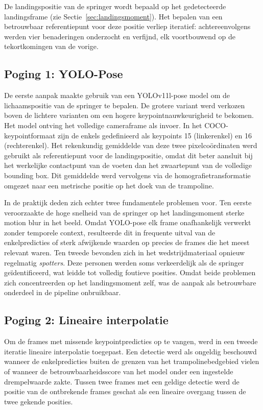 De landingspositie van de springer wordt bepaald op het gedetecteerde landingsframe (zie Sectie~\ref{sec:landingsmoment}). Het bepalen van een betrouwbaar referentiepunt voor deze positie verliep iteratief: achtereenvolgens werden vier benaderingen onderzocht en verfijnd, elk voortbouwend op de tekortkomingen van de vorige.

\subsection{Poging 1: YOLO-Pose}
\label{subsec:landingspositie-yolo}

De eerste aanpak maakte gebruik van een YOLOv11l-pose model \autocite{Jocher_Ultralytics_YOLO_2023} om de lichaamspositie van de springer te bepalen. De grotere variant werd verkozen boven de lichtere varianten om een hogere keypointnauwkeurigheid te bekomen. Het model ontving het volledige cameraframe als invoer. In het COCO-keypointformaat zijn de enkels gedefinieerd als keypoints 15 (linkerenkel) en 16 (rechterenkel). Het rekenkundig gemiddelde van deze twee pixelco{\"o}rdinaten werd gebruikt als referentiepunt voor de landingspositie, omdat dit beter aansluit bij het werkelijke contactpunt van de voeten dan het zwaartepunt van de volledige bounding box. Dit gemiddelde werd vervolgens via de homografietransformatie omgezet naar een metrische positie op het doek van de trampoline.

In de praktijk deden zich echter twee fundamentele problemen voor. Ten eerste veroorzaakte de hoge snelheid van de springer op het landingsmoment sterke motion blur in het beeld. Omdat YOLO-pose elk frame onafhankelijk verwerkt zonder temporele context, resulteerde dit in frequente uitval van de enkelpredicties of sterk afwijkende waarden op precies de frames die het meest relevant waren. Ten tweede bevonden zich in het wedstrijdmateriaal opnieuw regelmatig \textit{spotters}. Deze personen werden soms verkeerdelijk als de springer ge{\"i}dentificeerd, wat leidde tot volledig foutieve posities. Omdat beide problemen zich concentreerden op het landingsmoment zelf, was de aanpak als betrouwbare onderdeel in de pipeline onbruikbaar.

\subsection{Poging 2: Lineaire interpolatie}
\label{subsec:landingspositie-interpolatie}

Om de frames met missende keypointpredicties op te vangen, werd in een tweede iteratie lineaire interpolatie toegepast. Een detectie werd als ongeldig beschouwd wanneer de enkelpredicties buiten de grenzen van het trampolinebedgebied vielen of wanneer de betrouwbaarheidsscore van het model onder een ingestelde drempelwaarde zakte. Tussen twee frames met een geldige detectie werd de positie van de ontbrekende frames geschat als een lineaire overgang tussen de twee gekende posities.

